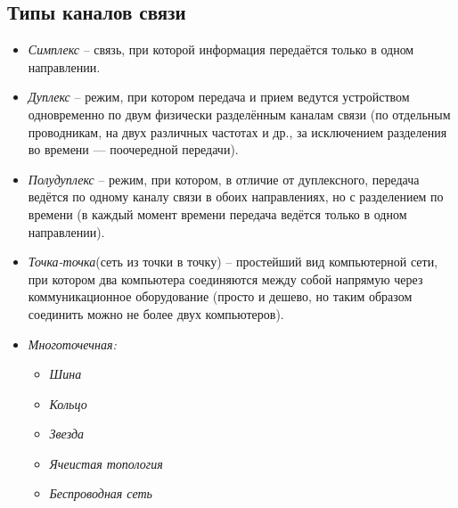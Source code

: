 \subsection{Типы каналов связи}
\begin{itemize}
\item \emph{Симплекс} -- связь, при которой информация передаётся только в одном направлении.
\item \emph{Дуплекс} -- режим, при котором передача и прием ведутся устройством одновременно по двум физически разделённым каналам связи (по отдельным проводникам, на двух различных частотах и др., за исключением разделения во времени — поочередной передачи).
\item \emph{Полудуплекс} -- режим, при котором, в отличие от дуплексного, передача ведётся по одному каналу связи в обоих направлениях, но с разделением по времени (в каждый момент времени передача ведётся только в одном направлении).
\item \emph{Точка-точка}(сеть из точки в точку) -- простейший вид компьютерной сети, при котором два компьютера соединяются между собой напрямую через коммуникационное оборудование (просто и дешево, но таким образом соединить можно не более двух компьютеров).
\newpage
\item \emph{Многоточечная:}
\begin{itemize}
\item \emph{Шина}
\item \emph{Кольцо}
\item \emph{Звезда}
\item \emph{Ячеистая топология}
\item \emph{Беспроводная сеть}
\end{itemize}
\end{itemize}